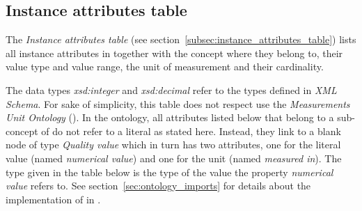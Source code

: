 \subsection{Instance attributes table}
\label{subsec:appendix_instance_attributes_table}

The \emph{Instance attributes table} (see section~\ref{subsec:instance_attributes_table}) lists all instance attributes in \thinkhomeweather together with the concept where they belong to, their value type and value range, the unit of measurement and their cardinality.

The data types \emph{xsd:integer} and \emph{xsd:decimal} refer to the types defined in \emph{XML Schema}\cite{xml-schema-datatypes}. For sake of simplicity, this table does not respect use the \emph{Measurements Unit Ontology} (\muo)\cite{MUO}. In the ontology, all attributes listed below that belong to a sub-concept of  do not refer to a literal as stated here. Instead, they link to a blank node of type \emph{Quality value} which in turn has two attributes, one for the literal value (named \emph{numerical value}) and one for the unit (named \emph{measured in}). The type given in the table below is the type of the value the property \emph{numerical value} refers to. See section~\ref{sec:ontology_imports} for details about the implementation of \muo in \thinkhomeweather.


